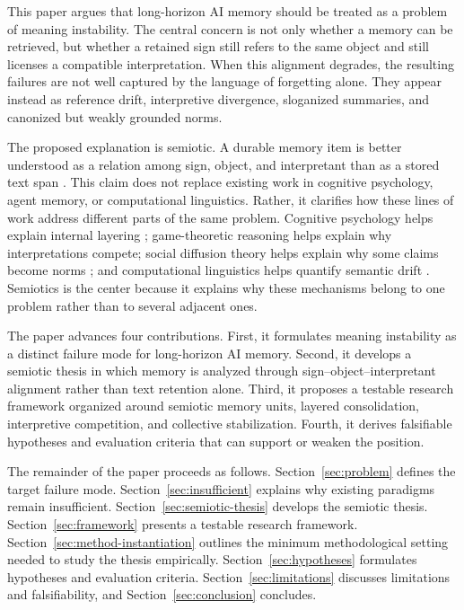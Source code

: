 \documentclass[10pt,twocolumn]{article}
\begin{document}
This paper argues that long-horizon AI memory should be treated as a problem of meaning instability. The central concern is not only whether a memory can be retrieved, but whether a retained sign still refers to the same object and still licenses a compatible interpretation. When this alignment degrades, the resulting failures are not well captured by the language of forgetting alone. They appear instead as reference drift, interpretive divergence, sloganized summaries, and canonized but weakly grounded norms.

The proposed explanation is semiotic. A durable memory item is better understood as a relation among sign, object, and interpretant than as a stored text span \cite{short2021peirce, lotman2005semiosphere}. This claim does not replace existing work in cognitive psychology, agent memory, or computational linguistics. Rather, it clarifies how these lines of work address different parts of the same problem. Cognitive psychology helps explain internal layering \cite{atkinson1968human, baddeley1974working, tulving1972episodic, nelson1990metamemory}; game-theoretic reasoning helps explain why interpretations compete; social diffusion theory helps explain why some claims become norms \cite{centola2010spread}; and computational linguistics helps quantify semantic drift \cite{hamilton2016diachronic}. Semiotics is the center because it explains why these mechanisms belong to one problem rather than to several adjacent ones.

The paper advances four contributions. First, it formulates meaning instability as a distinct failure mode for long-horizon AI memory. Second, it develops a semiotic thesis in which memory is analyzed through sign--object--interpretant alignment rather than text retention alone. Third, it proposes a testable research framework organized around semiotic memory units, layered consolidation, interpretive competition, and collective stabilization. Fourth, it derives falsifiable hypotheses and evaluation criteria that can support or weaken the position.

The remainder of the paper proceeds as follows. Section~\ref{sec:problem} defines the target failure mode. Section~\ref{sec:insufficient} explains why existing paradigms remain insufficient. Section~\ref{sec:semiotic-thesis} develops the semiotic thesis. Section~\ref{sec:framework} presents a testable research framework. Section~\ref{sec:method-instantiation} outlines the minimum methodological setting needed to study the thesis empirically. Section~\ref{sec:hypotheses} formulates hypotheses and evaluation criteria. Section~\ref{sec:limitations} discusses limitations and falsifiability, and Section~\ref{sec:conclusion} concludes.
\end{document}
